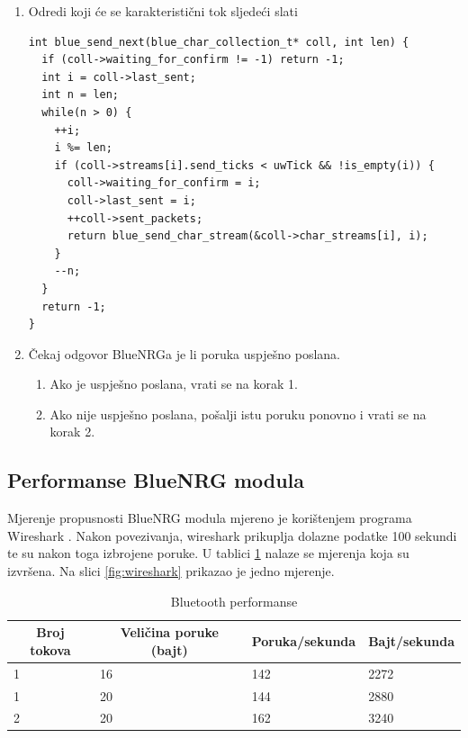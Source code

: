 \documentclass[times, utf8, diplomski]{diplomski}
\begin{document}
\begin{enumerate}
  \item Odredi koji će se karakteristični tok sljedeći slati
\begin{lstlisting}[caption = {Procedura za odabir karakterističnog toka koji će sljedeći biti poslan}]
int blue_send_next(blue_char_collection_t* coll, int len) {
  if (coll->waiting_for_confirm != -1) return -1;
  int i = coll->last_sent;
  int n = len;
  while(n > 0) {
    ++i;
    i %= len;
    if (coll->streams[i].send_ticks < uwTick && !is_empty(i)) {
      coll->waiting_for_confirm = i;
      coll->last_sent = i;
      ++coll->sent_packets;
      return blue_send_char_stream(&coll->char_streams[i], i);
    }
    --n;
  }
  return -1;
}
\end{lstlisting}
  \item Čekaj odgovor BlueNRGa je li poruka uspješno poslana.
    \begin{enumerate}
      \item Ako je uspješno poslana, vrati se na korak 1.
      \item Ako nije uspješno poslana, pošalji istu poruku ponovno i vrati se na korak 2.
    \end{enumerate}
\end{enumerate}


\subsection{Performanse BlueNRG modula}

Mjerenje propusnosti BlueNRG modula mjereno je korištenjem programa Wireshark \cite{wireshark}. Nakon povezivanja, wireshark prikuplja dolazne podatke 100 sekundi te su nakon toga izbrojene poruke. U tablici \ref{perftable} nalaze se mjerenja koja su izvršena. Na slici \ref{fig:wireshark} prikazao je jedno mjerenje.

\begin{table}[H]
  \begin{center}
    \begin{tabular}[c]{l|l|l|l}
      \hline
      \multicolumn{1}{c|}{\textbf{Broj tokova}} &
      \multicolumn{1}{c}{\textbf{Veličina poruke (bajt)}} &
      \multicolumn{1}{c}{\textbf{Poruka/sekunda}} &
      \multicolumn{1}{c}{\textbf{Bajt/sekunda}} \\
      \hline
      1 & 16 & 142 & 2272 \\
      1 & 20 & 144 & 2880 \\
      2 & 20 & 162 & 3240 \\
      \hline
    \end{tabular}
  \caption{Bluetooth performanse}
  \label{perftable}
  \end{center}
\end{table}
\end{document}
